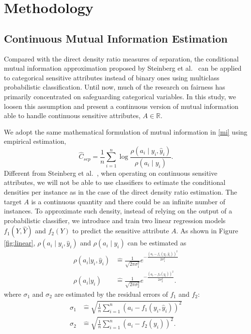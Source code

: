 \section{Methodology}\label{sec:methodology}
\subsection{Continuous Mutual Information Estimation}
\label{sec:Continuous MI}

\label{sect:GMI}
Compared with the direct density ratio measures of separation, the conditional mutual information approximation proposed by Steinberg et al.~\cite{steinberg2020fairness} can be applied to categorical sensitive attributes instead of binary ones using multiclass probabilistic classification. Until now, much of the research on fairness has primarily concentrated on safeguarding categorical variables. In this study, we loosen this assumption and present a continuous version of mutual information able to handle continuous sensitive attributes, $A\in \mathbb{R}$.

We adopt the same mathematical formulation of mutual information in \eqref{mi} using empirical estimation,
\begin{equation}\label{mi_con}
\hat{C}_{sep} = \frac{1}{n} \sum_{i=1}^n \log \frac{\rho(a_i\mid y_i, \hat{y}_i)}{\rho(a_i \mid y_i)}.
\end{equation}
Different from Steinberg et al.~\cite{steinberg2020fairness}, when operating on continuous sensitive attributes, we will not be able to use classifiers to estimate the conditional densities per instance as in the case of the direct density ratio estimation. The target $A$ is a continuous quantity and there could be an infinite number of instances. To approximate such density, instead of relying on the output of a probabilistic classifier, we introduce and train two linear regression models $f_1(Y, \hat{Y})$ and $f_2(Y)$ 
 to predict the sensitive attribute $A$. 
As shown in Figure \ref{fig:linear}, $\rho(a_i\mid y_i, \hat{y}_i)$ and ${\rho(a_i \mid y_i)}$ can be estimated as
\begin{equation}
\begin{aligned}
\rho(a_i | y_i, \hat{y}_i) &\hat{=} \frac{1}{\sqrt{2\pi \sigma_1^2}}e^{-\frac{(a_i-f_1(y_i, \hat{y}_i))^2}{2\sigma_1^2}} \\
\rho(a_i | y_i) &\hat{=} \frac{1}{\sqrt{2\pi \sigma_2^2}}e^{-\frac{(a_i-f_2(y_i))^2}{2\sigma_2^2}}.
\end{aligned}
\end{equation}
where $\sigma_1$ and $\sigma_2$ are estimated by the residual errors of $f_1$ and $f_2$:
\begin{equation*}
\begin{aligned}
\sigma_1 &\hat{=} \sqrt{\frac{1}{n}\sum_{i=1}^n (a_i-f_1(y_i, \hat{y}_i))^2} \\
\sigma_2 &\hat{=} \sqrt{\frac{1}{n}\sum_{i=1}^n (a_i-f_2(y_i))^2}.
\end{aligned}
\end{equation*}

